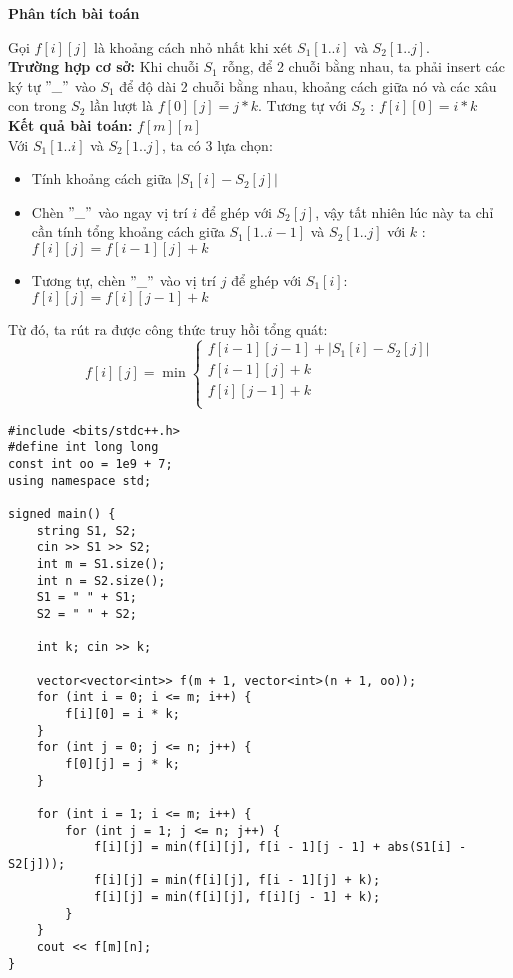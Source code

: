 \textbf{Phân tích bài toán}

Gọi $f[i][j]$ là khoảng cách nhỏ nhất khi xét $S_1[1..i]$ và $S_2[1..j]$. \\

\textbf{Trường hợp cơ sở:} Khi chuỗi $S_1$ rỗng, để 2 chuỗi bằng nhau, ta phải insert các ký tự $"\_"$ vào $S_1$ để độ dài 2 chuỗi bằng nhau, khoảng cách giữa nó và các xâu con trong $S_2$ lần lượt là $f[0][j] = j * k$. Tương tự với $S_2$ : $f[i][0] = i * k$ \\

\textbf{Kết quả bài toán:} $f[m][n]$\\

Với $S_1[1..i]$ và $S_2[1..j]$, ta có 3 lựa chọn: 
\begin{itemize}
    \item Tính khoảng cách giữa $|S_1[i] - S_2[j]|$
    \item Chèn $"\_"$ vào ngay vị trí $i$ để ghép với $S_2[j]$, vậy tất nhiên lúc này ta chỉ cần tính tổng khoảng cách giữa $S_1[1..i-1]$ và $S_2[1..j]$ với $k$ : $f[i][j] = f[i - 1][j] + k$
    \item Tương tự, chèn $"\_"$ vào vị trí $j$ để ghép với $S_1[i]$: $f[i][j] = f[i][j - 1] + k$
\end{itemize}

Từ đó, ta rút ra được công thức truy hồi tổng quát:
\[
f[i][j] = \min
\begin{cases}
    f[i - 1][j - 1] + |S_1[i] - S_2[j]| \\
    f[i - 1][j] + k \\
    f[i][j - 1] + k \\
\end{cases}
\]



\begin{lstlisting}[title=\centering \textbf{Cài đặt}]
#include <bits/stdc++.h>
#define int long long
const int oo = 1e9 + 7;
using namespace std;

signed main() {
    string S1, S2;
    cin >> S1 >> S2;
    int m = S1.size();
    int n = S2.size();
    S1 = " " + S1;
    S2 = " " + S2;

    int k; cin >> k;

    vector<vector<int>> f(m + 1, vector<int>(n + 1, oo));
    for (int i = 0; i <= m; i++) {
        f[i][0] = i * k;
    }
    for (int j = 0; j <= n; j++) {
        f[0][j] = j * k;
    }

    for (int i = 1; i <= m; i++) {
        for (int j = 1; j <= n; j++) {
            f[i][j] = min(f[i][j], f[i - 1][j - 1] + abs(S1[i] - S2[j]));
            f[i][j] = min(f[i][j], f[i - 1][j] + k);
            f[i][j] = min(f[i][j], f[i][j - 1] + k);
        }
    }
    cout << f[m][n];
}

\end{lstlisting}

